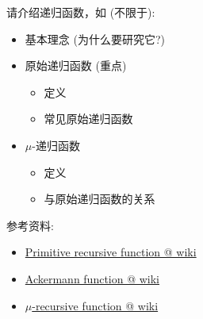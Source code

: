 \documentclass[a4paper, justified]{tufte-handout}
\begin{document}
\vspace{0.50cm}
\begin{ot}
  请介绍递归函数，如 (不限于):
  \begin{itemize}
    \item 基本理念 (为什么要研究它?)
    \item 原始递归函数 (重点)
      \begin{itemize}
	\item 定义
	\item 常见原始递归函数
      \end{itemize}
    \item $\mu$-递归函数
      \begin{itemize}
	\item 定义
	\item 与原始递归函数的关系
      \end{itemize}
  \end{itemize}

  \noindent 参考资料:
  \begin{itemize}
    \item \href{https://en.wikipedia.org/wiki/Primitive\_recursive\_function}{Primitive recursive function @ wiki}
    \item \href{https://en.wikipedia.org/wiki/Ackermann\_function}{Ackermann function @ wiki}
    \item \href{https://en.wikipedia.org/wiki/\%CE\%9C-recursive\_function}{$\mu$-recursive function @ wiki}
  \end{itemize}
\end{ot}



\begincorrection


\beginfb

\end{document}
